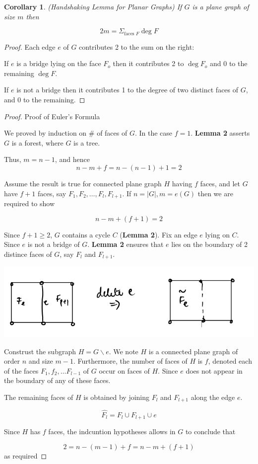 \documentclass[12pt]{article}
\newtheorem*{corollary}{Corollary}
\begin{document}
\begin{corollary}

	(Handshaking Lemma for Planar Graphs)
	If $G$ is a plane graph of size $m$ then

	\[2m = \Sigma_{\text{faces } F} \deg  F\]
\end{corollary}

\begin{proof}
	Each edge $e$ of $G$ contributes 2 to the sum on the right:

	If $e$ is a bridge lying on the face $F_{o}$ then it contributes 2 to $\deg F_{o}$ and 0 to the remaining $\deg F$.


	If $e$ is not a bridge then it contributes 1 to the degree of two distinct faces of $G$, and 0 to the remaining.
\end{proof}


\begin{proof}

	Proof of Euler's Formula

	We proved by induction on $\#$ of faces of $G$. In the case $f=1$. \textbf{Lemma 2} asserts $G$ is a forest, where $G$ is a tree.

	Thus, $m=n-1$, and hence
	\[n-m +f = n-(n-1)+1 = 2\]

	Assume the result is true for connected plane graph $H$ having $f$ faces, and let $G$ have $f+1$ faces, say $F_{1}, F_{2}, \dots, F_{l}, F_{l+1}$.
	If $n = \vert G\vert, m = e(G)$ then we are required to show

	\[n-m +(f+1) = 2\]

	Since $f+1\ge 2$, $G$ contains a cycle $C$ (\textbf{Lemma 2}). Fix an edge $e$ lying on $C$. Since $e$ is not a bridge of $G$. \textbf{Lemma 2} ensures that $e$ lies on the boundary of 2 distince faces of $G$, say $F_{l}$ and $F_{l+1}$.
	\begin{center}
		\includegraphics[scale=0.5]{eulerproof}
	\end{center}


	Construst the subgraph $H=G\backslash e$. We note $H$ is a connected plane graph of order $n$ and size $m-1$.
	Furthermore, the number of faces of $H$ is $f$, denoted each of the faces $F_{1}, f_{2},\dots F_{l-1}$ of $G$ occur on faces of $H$. Since $e$ does not appear in the boundary of any of these faces.

	The remaining faces of $H$ is obtained by joining $F_{l}$ and $F_{l+1}$ along the edge $e$.

	\[\hat{F_{l}} = F_{l} \cup F_{l+1} \cup e\]

	Since $H$ has $f$ faces, the indcuntion hypotheses allows in $G$ to conclude that

	\[ 2 = n- (m-1) + f = n - m + (f+1)\]
	as required

\end{proof}
\end{document}
